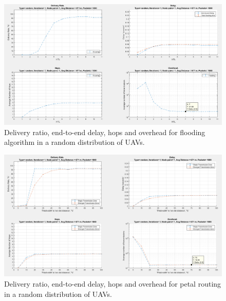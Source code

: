 \thispagestyle{lscapedplain}
\begin{landscape}
\begin{figure}
\centering
\includegraphics[width=1\textwidth]{ncsuthesis-0.6/Appendix-A/figs/flood_random.png}
\caption{Delivery ratio, end-to-end delay, hops and overhead for flooding algorithm in a random distribution of UAVs.}
\label{fig:flood_random}
\end{figure}
\end{landscape}

\thispagestyle{lscapedplain}
\begin{landscape}
\begin{figure}
\centering
\includegraphics[width=1\textwidth]{ncsuthesis-0.6/Appendix-A/figs/petal_random.png}
\caption{Delivery ratio, end-to-end delay, hops and overhead for petal routing in a random distribution of UAVs.}
\label{fig:petal_random}
\end{figure}
\end{landscape}

\restoregeometry
\pagestyle{plain}
\thispagestyle{plain}

